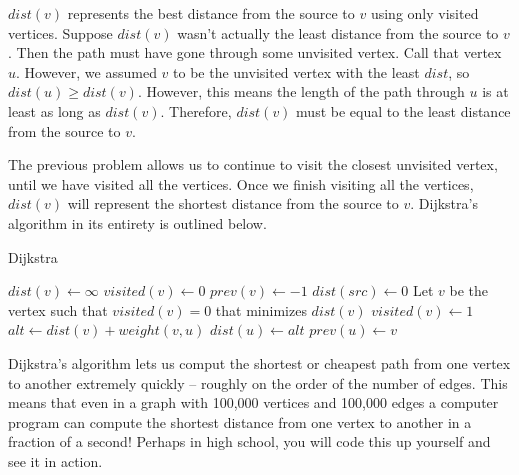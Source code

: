 \documentclass[11pt]{article}
\begin{document}
\begin{solution}
$dist(v)$ represents the best distance from the source to $v$ using only visited vertices. Suppose $dist(v)$ wasn't actually the least
distance from the source to $v$. Then the path must have gone through some unvisited vertex. Call that vertex $u$. However, we assumed $v$ to be the unvisited vertex
with the least $dist$, so $dist(u) \ge dist(v)$. However, this means the length of the path through $u$ is at least as long as $dist(v)$.
Therefore, $dist(v)$ must be equal to the least distance from the source to $v$.
\end{solution}

The previous problem allows us to continue to visit the closest unvisited vertex, until we have visited all the vertices. Once we finish visiting all the vertices,
$dist(v)$ will represent the shortest distance from the source to $v$. Dijkstra's algorithm in its entirety is outlined below.

\begin{algorithm}[H]
\caption{Dijkstra}
\begin{algorithmic}
	\State $dist(v) \gets \infty$ 
	\State $visited(v) \gets 0$ 
    \State $prev(v) \gets -1$ 
\EndFor
\State $dist(src) \gets 0$ 
	\State Let $v$ be the vertex such that $visited(v)=0$ that minimizes $dist(v)$
    \State $visited(v) \gets 1$ 
    		\State $alt \gets dist(v) + weight(v, u)$
				\State $dist(u) \gets alt$ 
   	        	\State $prev(u) \gets v$
			\EndIf
        \EndIf
    \EndFor
\EndWhile
\end{algorithmic}
\end{algorithm}

Dijkstra's algorithm lets us comput the shortest or cheapest path from one vertex to another extremely quickly -- roughly on the order of the number of edges.
This means that even in a graph with 100,000 vertices and 100,000 edges a computer program can compute the shortest distance from one vertex to another in a fraction of 
a second! Perhaps in high school, you will code this up yourself and see it in action.
\end{document}
